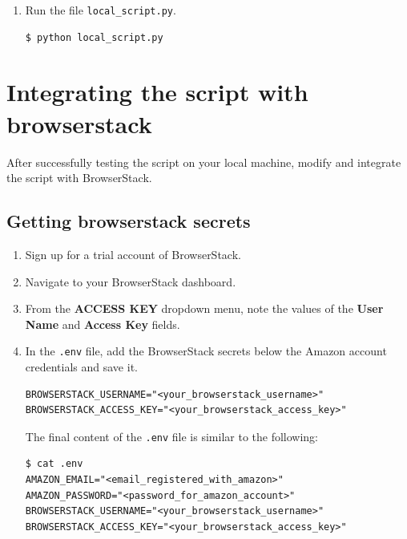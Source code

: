 \documentclass{article}
\begin{document}
\begin{enumerate}
\begin{lstlisting}[style=python]
password_textbox = browser.find_element(By.ID, "ap_password")
slow_typing(password_textbox, AMAZON_PASSWORD)
time.sleep(2)

sign_in_button = browser.find_element(By.ID, "auth-signin-button-announce")
sign_in_button.submit()
time.sleep(5)

browser.close()
\end{lstlisting}

    \item Run the file \texttt{local\_script.py}.

\begin{lstlisting}[style=bash]
$ python local_script.py
\end{lstlisting}
\end{enumerate}

\section*{Integrating the script with browserstack}

After successfully testing the script on your local machine, modify and integrate the script with BrowserStack.

\subsection*{Getting browserstack secrets}

\begin{enumerate}
    \item Sign up for a trial account of BrowserStack.
    
    \item Navigate to your BrowserStack dashboard.
    
    \item From the \textbf{ACCESS KEY} dropdown menu, note the values of the \textbf{User Name} and \textbf{Access Key} fields.
    
    \item In the \texttt{.env} file, add the BrowserStack secrets below the Amazon account credentials and save it.

\begin{lstlisting}[style=bash]
BROWSERSTACK_USERNAME="<your_browserstack_username>"
BROWSERSTACK_ACCESS_KEY="<your_browserstack_access_key>"
\end{lstlisting}

    The final content of the \texttt{.env} file is similar to the following:

\begin{lstlisting}[style=bash]
$ cat .env
AMAZON_EMAIL="<email_registered_with_amazon>"
AMAZON_PASSWORD="<password_for_amazon_account>"
BROWSERSTACK_USERNAME="<your_browserstack_username>"
BROWSERSTACK_ACCESS_KEY="<your_browserstack_access_key>"
\end{lstlisting}
\end{enumerate}
\end{document}
